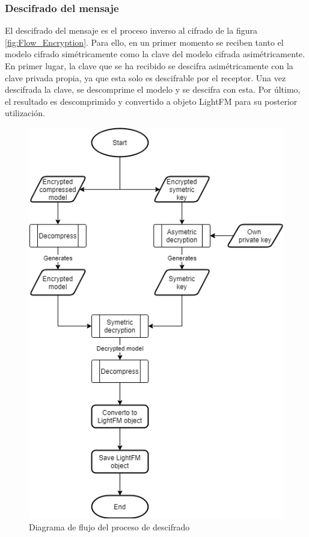 \subsubsection{Descifrado del mensaje}
El descifrado del mensaje es el proceso inverso al cifrado de la figura \ref{fig:Flow_Encryption}. Para ello, en un primer momento se reciben tanto el modelo cifrado simétricamente como la clave del modelo cifrada asimétricamente. En primer lugar, la clave que se ha recibido se descifra asimétricamente con la clave privada propia, ya que esta solo es descifrable por el receptor. Una vez descifrada la clave, se descomprime el modelo y se descifra con esta. Por último, el resultado es descomprimido y convertido a objeto LightFM para su posterior utilización. 
\begin{figure}[H]
    \centering
    \includegraphics[height=0.6\textheight]{Figuras/flowchart_decryption.png}    
    \caption{Diagrama de flujo del proceso de descifrado} 
    \label{fig:Flow_Decryption}
\end{figure}